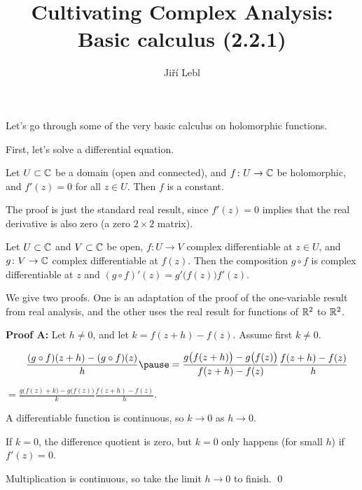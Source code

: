 \documentclass[10pt,aspectratio=169]{beamer}
\author{Ji\v{r}\'i Lebl}
\institute[OSU]{%
Departemento pri Matematiko de Oklahoma {\^S}tata Universitato}
\title{Cultivating Complex Analysis:\\%
Basic calculus (2.2.1)}
\date{}
\begin{document}
\begin{frame}
\titlepage
\end{frame}

\begin{frame}
Let's go through some of the very basic calculus on holomorphic functions.

\medskip
\pause

First, let's solve a differential equation.

\pause

\begin{proposition}
Let $U \subset {\mathbb{C}}$ be a domain (open and connected),
and $f \colon U \to {\mathbb{C}}$ be holomorphic, and $f'(z) = 0$ for all $z \in U$.
Then $f$ is a constant.
\end{proposition}

\pause

The proof is just the standard real result, since $f'(z)=0$ implies that
the real derivative is also zero (a zero $2 \times 2$ matrix).
\end{frame}

\begin{frame}
\begin{proposition}
Let $U \subset {\mathbb{C}}$ and $V \subset {\mathbb{C}}$ be open, $f \colon U \to V$
complex differentiable at $z \in U$, and $g \colon V \to {\mathbb{C}}$ complex differentiable
at $f(z)$.  Then the composition $g \circ f$
is complex differentiable at $z$ and $(g \circ f)'(z) = g'\bigl(f(z)\bigr) f'(z)$.
\end{proposition}

\pause

We give two proofs.  One is an adaptation of the proof of the one-variable result
from real analysis, and the other uses the real result for functions of ${\mathbb{R}}^2$
to ${\mathbb{R}}^2$.

\medskip
\pause

\textbf{Proof A:}
Let $h \not= 0$, and let $k = f(z+h) -f(z)$.
Assume first $k\not= 0$.

\medskip
\pause

$\displaystyle
\qquad
\frac{(g \circ f)(z+h) - (g \circ f)(z)}{h}
\pause
 =
\frac{g \bigl( f(z+h) \bigr) - g\bigl( f(z) \bigr)}{f(z+h)-f(z)}
\frac{f(z+h)-f(z)}{h}
$

\pause
\medskip

%
$\displaystyle
=
\frac{g \bigl( f(z) + k \bigr) - g\bigl( f(z) \bigr)}{k}
\frac{f(z+h)-f(z)}{h} .
$

\medskip
\pause

A differentiable function is continuous, so $k \to 0$ as $h \to 0$.

\pause
\medskip

If $k=0$, the difference quotient is zero, but $k=0$ only happens (for small $h$)
if $f'(z)=0$.

\pause
\medskip

Multiplication is continuous, so take the limit $h \to 0$ to finish.
\qed

\end{frame}
\end{document}
